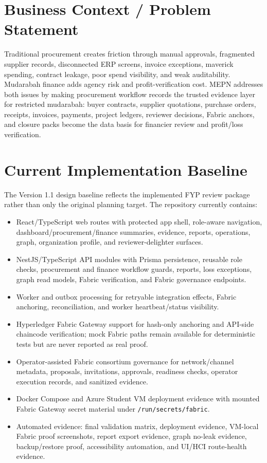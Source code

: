 \documentclass[11pt,a4paper]{article}
\newcommand{\codename}{MEPN}
\begin{document}
\section{Business Context / Problem Statement}
Traditional procurement creates friction through manual approvals, fragmented supplier records, disconnected ERP screens, invoice exceptions, maverick spending, contract leakage, poor spend visibility, and weak auditability. Mudarabah finance adds agency risk and profit-verification cost. \codename{} addresses both issues by making procurement workflow records the trusted evidence layer for restricted mudarabah: buyer contracts, supplier quotations, purchase orders, receipts, invoices, payments, project ledgers, reviewer decisions, Fabric anchors, and closure packs become the data basis for financier review and profit/loss verification.

\section{Current Implementation Baseline}
The Version 1.1 design baseline reflects the implemented FYP review package rather than only the original planning target. The repository currently contains:
\begin{itemize}
\item React/TypeScript web routes with protected app shell, role-aware navigation, dashboard/procurement/finance summaries, evidence, reports, operations, graph, organization profile, and reviewer-delighter surfaces.
\item NestJS/TypeScript API modules with Prisma persistence, reusable role checks, procurement and finance workflow guards, reports, loss exceptions, graph read models, Fabric verification, and Fabric governance endpoints.
\item Worker and outbox processing for retryable integration effects, Fabric anchoring, reconciliation, and worker heartbeat/status visibility.
\item Hyperledger Fabric Gateway support for hash-only anchoring and API-side chaincode verification; mock Fabric paths remain available for deterministic tests but are never reported as real proof.
\item Operator-assisted Fabric consortium governance for network/channel metadata, proposals, invitations, approvals, readiness checks, operator execution records, and sanitized evidence.
\item Docker Compose and Azure Student VM deployment evidence with mounted Fabric Gateway secret material under \texttt{/run/secrets/fabric}.
\item Automated evidence: final validation matrix, deployment evidence, VM-local Fabric proof screenshots, report export evidence, graph no-leak evidence, backup/restore proof, accessibility automation, and UI/HCI route-health evidence.
\end{itemize}
\end{document}
